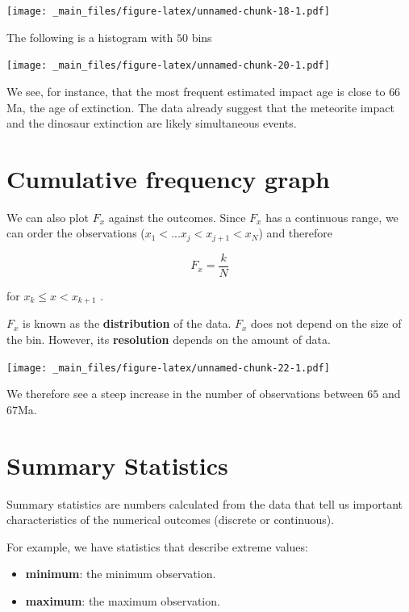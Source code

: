 \documentclass[
]{book}
\providecommand{\tightlist}{%
  \setlength{\itemsep}{0pt}\setlength{\parskip}{0pt}}
\begin{document}
\texttt{[image: \_main\_files/figure-latex/unnamed-chunk-18-1.pdf]}

The following is a histogram with \(50\) bins

\texttt{[image: \_main\_files/figure-latex/unnamed-chunk-20-1.pdf]}

We see, for instance, that the most frequent estimated impact age is close to \(66\)Ma, the age of extinction. The data already suggest that the meteorite impact and the dinosaur extinction are likely simultaneous events.

\hypertarget{cumulative-frequency-graph-1}{%
\section{Cumulative frequency graph}\label{cumulative-frequency-graph-1}}

We can also plot \(F_x\) against the outcomes. Since \(F_x\) has a continuous range, we can order the observations (\(x_1 <... x_j < x_{j+1} < x_N\)) and therefore

\[F_x = \frac{k}{N}\]

for \(x_{k} \leq x < x_{k+ 1}\) .

\(F_x\) is known as the \textbf{distribution} of the data. \(F_x\) does not depend on the size of the bin. However, its \textbf{resolution} depends on the amount of data.

\texttt{[image: \_main\_files/figure-latex/unnamed-chunk-22-1.pdf]}

We therefore see a steep increase in the number of observations between \(65\) and \(67\)Ma.

\hypertarget{summary-statistics}{%
\section{Summary Statistics}\label{summary-statistics}}

Summary statistics are numbers calculated from the data that tell us important characteristics of the numerical outcomes (discrete or continuous).

For example, we have statistics that describe extreme values:

\begin{itemize}
\tightlist
\item
  \textbf{minimum}: the minimum observation.
\item
  \textbf{maximum}: the maximum observation.
\end{itemize}
\end{document}
